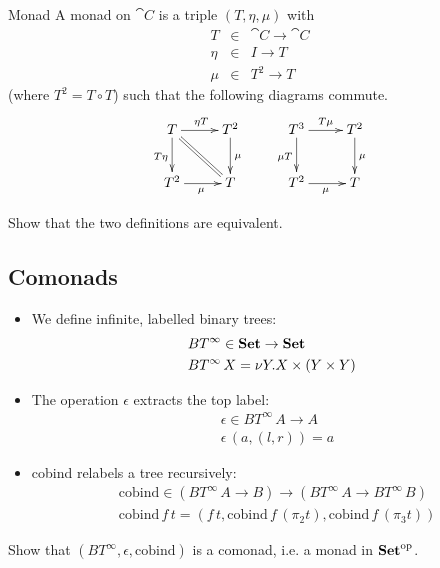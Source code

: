 \documentclass[handout]{beamer}
\begin{document}
\begin{frame}
  \begin{block}{Monad}
    A monad on $\cat{C}$ is a triple $(T,\eta,\mu)$ with
    \begin{eqnarray*}
      T & \in & \cat{C} \to \cat{C}\\
      \eta & \in & I \to T \\
      \mu & \in & T^2 \to T
    \end{eqnarray*}
    (where $T^2 = T\circ T$) such that the following diagrams commute.
    \[\xymatrix{
      T \ar[r]^{\eta T} \ar[d]_{T\eta} \ar@{=}[dr]& T^2\ar[d]^\mu\\
      T^2 \ar[r]_\mu & T}
    \qquad
    \xymatrix{
      T^3 \ar[r]^{T \mu} \ar[d]_{\mu T} & T^2\ar[d]^\mu\\
      T^2 \ar[r]_\mu & T}
    \]
  \end{block}
  \begin{exercise}
    Show that the two definitions are equivalent.
  \end{exercise}
\end{frame}

\subsection{Comonads}

\begin{frame}
  \begin{itemize}
  \item We define infinite, labelled binary trees:
    \begin{align*}
      & BT^\infty\in \mathbf{Set} \to \mathbf{Set}\\
      & BT^\infty\,X = \nu Y. X \times (Y \times Y)
    \end{align*}

  \item The operation $\epsilon$ extracts the top label:
    \begin{align*}
      & \epsilon \in BT^\infty\,A \to A\\
      & \epsilon\,(a,(l,r)) = a
    \end{align*}

  \item cobind relabels a tree recursively:
    \begin{align*}
      & \mathrm{cobind} \in (BT^\infty\,A \to B) \to  (BT^\infty\,A \to BT^\infty\,B) \\
      & \mathrm{cobind}\,f\,t = (f\,t,\mathrm{cobind}\,f\,(\pi_2 t),\mathrm{cobind}\,f\,(\pi_3 t))
    \end{align*}
  \end{itemize}
  \begin{exercise}
    Show that $(BT^\infty,\epsilon,\mathrm{cobind})$ is a comonad, i.e. a monad
    in $\mathbf{Set}^{\mathrm{op}}$.
  \end{exercise}
\end{frame}
\end{document}
